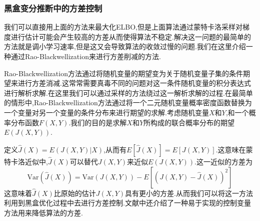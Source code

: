 \documentclass{ctexart}
\begin{document}
\subsubsection{黑盒变分推断中的方差控制}
我们可以直接用上面的方法来最大化ELBO,但是上面算法通过蒙特卡洛采样对梯度进行估计可能会产生较高的方差从而使得算法不稳定.解决这一问题的最简单的方法就是调小学习速率,但是这又会导致算法的收敛过慢的问题.我们在这里介绍一种通过Rao-Blackwellization来进行方差削减的方法.


Rao-Blackwellization方法通过将随机变量的期望变为关于随机变量子集的条件期望来进行方差消减.这常常需要真毒不同的问题对这一条件随机变量的积分表达式进行解析求解.在这里我们可以通过采样的方法绕过这一解析求解的过程.在最简单的情形中,Rao-Blackwellization方法通过将一个二元随机变量概率密度函数替换为一个变量对另一个变量的条件分布来进行期望的求解.考虑随机变量$X$和$Y$,和一个概率分布函数$F(X,Y)$.我们的目的是求解$X$和$Y$所构成的联合概率分布的期望$E(J(X,Y))$.


定义$\hat{J}(X) = E(J(X,Y)|X)$,从而有$E[\hat{J}(X)] = E[J(X,Y)]$.这意味在蒙特卡洛近似中,$\hat{J}(X)$可以替代$J(X,Y)$来近似$E(J(X,Y))$.这一近似的方差为
\begin{equation*}
	\text{Var}(\hat{J}(X)) = \text{Var}(J(X,Y)) - E[(J(X,Y)-\hat{J}(X))^2]
\end{equation*}
这意味着$\hat{J}(X)$比原始的估计$J(X,Y)$具有更小的方差.从而我们可以将这一方法利用到黑盒优化过程中去进行方差控制.文献\cite{ranganath2014black}中还介绍了一种易于实现的控制变量方法用来降低算法的方差.
\end{document}
